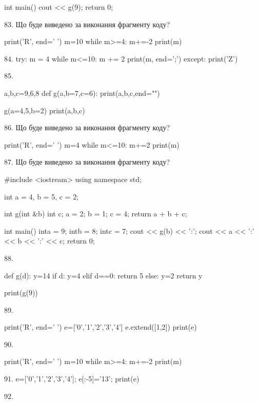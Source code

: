 \documentclass[11pt]{article}
\begin{document}
int main(){
    cout << g(9);
    return 0;
}



83. Що буде виведено за виконання фрагменту коду?

print('R', end=' ')
m=10
while m>=4:
    m+=-2
print(m)



84. 
try:
    m = 4
    while m<=10:
        m += 2
    print(m, end=';')
except:
    print('Z')


85. 

a,b,c=9,6,8
def g(a,b=7,c=6):
    print(a,b,c,end="")

g(a=4,5,b=2)
print(a,b,c)



86. Що буде виведено за виконання фрагменту коду?

print('R', end=' ')
m=4
while m<=10:
    m+=2
print(m)



87. Що буде виведено за виконання фрагменту коду?

#include <iostream>
using namespace std;

int a = 4, b = 5, c = 2;

int g(int &b){
int c;    a = 2;
    b = 1;
    c = 4;
    return a + b + c;
}

int main(){
    inta = 9;
    intb = 8;
    intc = 7;
    cout << g(b) << ':';
    cout << a << ':' << b << ':' << c;
    return 0; 
}


88. 

def g(d):
    y=14
    if d: 
        y=4
    elif d==0:
         return 5
    else:
         y=2
    return y

print(g(9))


89. 

print('R', end=' ')
e=['0','1','2','3','4']
e.extend([1,2])
print(e)



90. 

print('R', end=' ')
m=10
while m>=4:
    m+=-2
print(m)



91. 
e=['0','1','2','3','4']; e[:-5]='13'; print(e)

92. 
\end{document}
